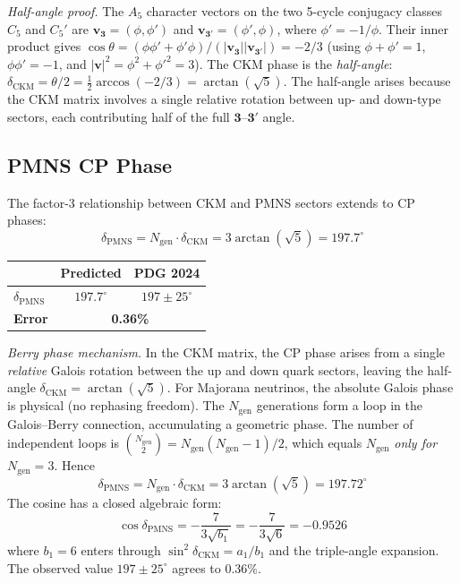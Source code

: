 \documentclass[12pt,a4paper]{article}
\theoremstyle{definition}
\begin{document}
\textit{Half-angle proof.}  The $A_5$ character vectors on the two 5-cycle conjugacy classes $C_5$ and $C_5'$ are $\mathbf{v}_{\mathbf{3}} = (\phi, \phi')$ and $\mathbf{v}_{\mathbf{3'}} = (\phi', \phi)$, where $\phi' = -1/\phi$.  Their inner product gives $\cos\theta = (\phi\phi' + \phi'\phi)/(|\mathbf{v}_{\mathbf{3}}||\mathbf{v}_{\mathbf{3'}}|) = -2/3$ (using $\phi + \phi' = 1$, $\phi\phi' = -1$, and $|\mathbf{v}|^2 = \phi^2 + \phi'^2 = 3$).  The CKM phase is the \emph{half-angle}: $\delta_{\text{CKM}} = \theta/2 = \tfrac{1}{2}\arccos(-2/3) = \arctan(\sqrt{5})$.  The half-angle arises because the CKM matrix involves a single relative rotation between up- and down-type sectors, each contributing half of the full $\mathbf{3}$--$\mathbf{3'}$ angle.

\subsection{PMNS CP Phase}

The factor-3 relationship between CKM and PMNS sectors extends to CP phases:
\begin{equation}
\boxed{\delta_{\text{PMNS}} = N_{\text{gen}} \cdot \delta_{\text{CKM}} = 3\arctan(\sqrt{5}) = 197.7^\circ}
\end{equation}
\begin{center}
\begin{tabular}{lcc}
\toprule
& \textbf{Predicted} & \textbf{PDG 2024} \\
\midrule
$\delta_{\text{PMNS}}$ & $197.7^\circ$ & $197 \pm 25^\circ$ \\
\textbf{Error} & \multicolumn{2}{c}{\textbf{0.36\%}} \\
\bottomrule
\end{tabular}
\end{center}

\noindent\textit{Berry phase mechanism.}  In the CKM matrix, the CP phase arises from a single \emph{relative} Galois rotation between the up and down quark sectors, leaving the half-angle $\delta_{\text{CKM}} = \arctan(\sqrt{5})$.  For Majorana neutrinos, the absolute Galois phase is physical (no rephasing freedom).  The $N_{\text{gen}}$ generations form a loop in the Galois--Berry connection, accumulating a geometric phase.  The number of independent loops is $\binom{N_{\text{gen}}}{2} = N_{\text{gen}}(N_{\text{gen}}-1)/2$, which equals $N_{\text{gen}}$ \emph{only for} $N_{\text{gen}} = 3$.  Hence
\begin{equation}
\delta_{\text{PMNS}} = N_{\text{gen}} \cdot \delta_{\text{CKM}} = 3\arctan(\sqrt{5}) = 197.72^\circ
\end{equation}
The cosine has a closed algebraic form:
\begin{equation}
\cos\delta_{\text{PMNS}} = -\frac{7}{3\sqrt{b_1}} = -\frac{7}{3\sqrt{6}} = -0.9526
\end{equation}
where $b_1 = 6$ enters through $\sin^2\delta_{\text{CKM}} = a_1/b_1$ and the triple-angle expansion.  The observed value $197 \pm 25^\circ$ agrees to 0.36\%.
\end{document}
